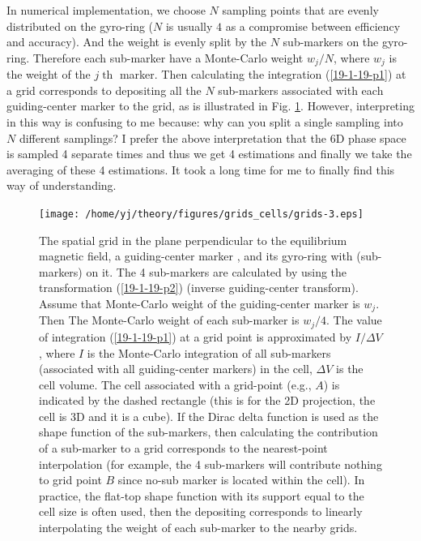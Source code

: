 \documentclass{article}
\newcommand{\tmcolor}[2]{{\color{#1}{#2}}}
\newcommand{\tmop}[1]{\ensuremath{\operatorname{#1}}}
\begin{document}
In numerical implementation, we choose $N$ sampling points that are evenly
distributed on the gyro-ring ($N$ is usually $4$ as a compromise between
efficiency and accuracy). And the weight is evenly split by the $N$
sub-markers on the gyro-ring. Therefore each sub-marker have a Monte-Carlo
weight $w_j / N$, where $w_j$ is the weight of the $j \tmop{th}$ marker. Then
calculating the integration (\ref{19-1-19-p1}) at a grid corresponds to
depositing all the $N$ sub-markers associated with each guiding-center marker
to the grid, as is illustrated in Fig. \ref{19-1-19-p4}. However, interpreting
in this way is confusing to me because: why can you split a single sampling
into $N$ different samplings? I prefer the above interpretation that the 6D
phase space is sampled 4 separate times and thus we get 4 estimations and
finally we take the averaging of these 4 estimations. It took a long time for
me to finally find this way of understanding.

\begin{figure}[h]
  \texttt{[image: /home/yj/theory/figures/grids\_cells/grids-3.eps]}
  \caption{\label{19-1-19-p4}The spatial grid in the plane perpendicular to
  the equilibrium magnetic field, a guiding-center marker \tmcolor{red}{$C$},
  and its gyro-ring with \tmcolor{blue}{4 sampling points} (sub-markers) on
  it. The 4 sub-markers are calculated by using the transformation
  (\ref{19-1-19-p2}) (inverse guiding-center transform). Assume that
  Monte-Carlo weight of the guiding-center marker \tmcolor{red}{$C$} is $w_j$.
  Then The Monte-Carlo weight of each sub-marker is $w_j / 4$. The value of
  integration (\ref{19-1-19-p1}) at a grid point is approximated by $I /
  \Delta V$, where $I$ is the Monte-Carlo integration of all sub-markers
  (associated with all guiding-center markers) in the cell, $\Delta V$ is the
  cell volume. The cell associated with a grid-point (e.g., $A$) is indicated
  by the dashed rectangle (this is for the 2D projection, the cell is 3D and
  it is a cube). If the Dirac delta function is used as the shape function of
  the sub-markers, then calculating the contribution of a sub-marker to a grid
  corresponds to the nearest-point interpolation (for example, the 4
  sub-markers will contribute nothing to grid point $B$ since no-sub marker is
  located within the cell). In practice, the flat-top shape function with its
  support equal to the cell size is often used, then the depositing
  corresponds to linearly interpolating the weight of each sub-marker to the
  nearby grids.}
\end{figure}
\end{document}
